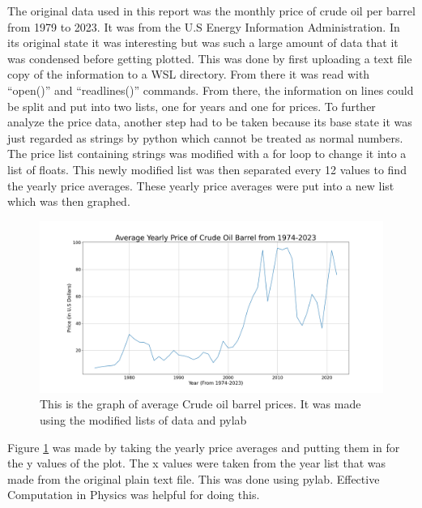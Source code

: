 The original data used in this report was the monthly price of crude oil per barrel from 1979 to 2023. It was from the U.S Energy Information Administration. \cite{EIA_2024} In its original state it was interesting but was such a large amount of data that it was condensed before getting plotted. This was done by first uploading a text file copy of the information to a WSL directory. From there it was read with “open()” and “readlines()” commands. From there, the information on lines could be split and put into two lists, one for years and one for prices. To further analyze the price data, another step had to be taken because its base state it was just regarded as strings by python which cannot be treated as normal numbers.\\
	\newline The price list containing strings was modified with a for loop to change it into a list of floats. This newly modified list was then separated every 12 values to find the yearly price averages. These yearly price averages were put into a new list which was then graphed. \\



\begin{figure}
  \centering
  \includegraphics[width=1.0\textwidth]{OilPrice1.png}
  \caption{This is the graph of average Crude oil barrel prices. It was made using the modified lists of data and pylab}
 
  \label{fig:PricePlot}
\end{figure}

 Figure \ref{fig:PricePlot} was made by taking the yearly price averages and putting them in for 
the y values of the plot. The x values were taken from the year list that was made from the original plain text file.
This was done using pylab. Effective Computation in Physics was helpful for doing this. \cite{ECP_2015}
